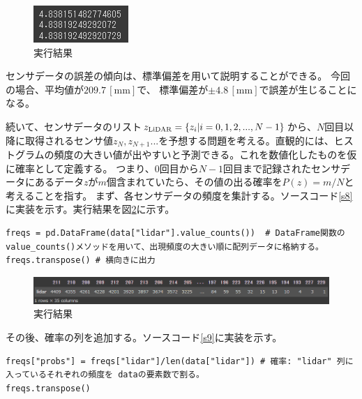 \begin{figure}[htbp]
  \begin{center}
  \includegraphics[width=.3\linewidth]{img/7.png}
  \caption{実行結果}
  \label{j7}
  \end{center}
\end{figure}

センサデータの誤差の傾向は、標準偏差を用いて説明することができる。
今回の場合、平均値が$209.7\mathrm{\,[mm]}$で、 標準偏差が$\pm 4.8 \mathrm{\,[mm]}$で誤差が生じることになる。


続いて、センサデータのリスト$z_{\rm{LiDAR}} = \{z_i|i = 0, 1, 2,..., N-1\}$から、$N$回目以降に取得されるセンサ値$z_N, z_{N+1}...$を予想する問題を考える。直観的には、ヒストグラムの頻度の大きい値が出やすいと予測できる。これを数値化したものを仮に確率として定義する。
つまり、0回目から$N-1$回目まで記録されたセンサデータにあるデータ$z$が$m$個含まれていたら、その値の出る確率を$P(z) = m/N$と考えることを指す。
まず、各センサデータの頻度を集計する。ソースコード\ref{s8}\cite{robo}に実装を示す。実行結果を図\ref{j8}に示す。

\begin{lstlisting}[caption=センサデータの頻度の集計,label=s8]
freqs = pd.DataFrame(data["lidar"].value_counts())  # DataFrame関数のvalue_counts()メソッドを用いて、出現頻度の大きい順に配列データに格納する。
freqs.transpose() # 横向きに出力
\end{lstlisting}

\begin{figure}[htbp]
  \begin{center}
  \includegraphics[width=\linewidth]{img/8.png}
  \caption{実行結果}
  \label{j8}
  \end{center}
\end{figure}

その後、確率の列を追加する。ソースコード\ref{s9}\cite{robo}に実装を示す。
\begin{lstlisting}[caption=確率の列の追加,label=s9]
freqs["probs"] = freqs["lidar"]/len(data["lidar"]) # 確率: "lidar" 列に入っているそれぞれの頻度を dataの要素数で割る。
freqs.transpose()  
\end{lstlisting}

